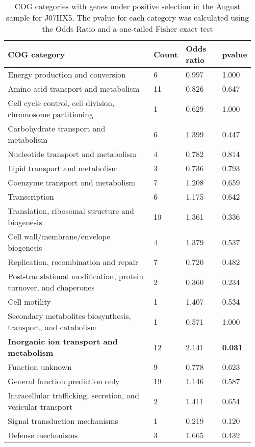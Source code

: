 \begin{table}[hb]
\footnotesize 
	\tabcolsep=0.11cm 
\caption{COG categories with genes under positive selection in the August sample for J07HX5. The pvalue for each category was calculated using the Odds Ratio and a one-tailed Fisher exact test} 
\begin{tabularx}{\textwidth}{L{6cm}R{2cm}R{2cm}R{2cm}} 
\hline 
\textbf{COG category} & \textbf{Count} & \textbf{Odds ratio} & \textbf{pvalue} \\ 
\hline 
Energy production and conversion & 6 & 0.997 & 1.000 \\ 
Amino acid transport and metabolism & 11 & 0.826 & 0.647 \\ 
Cell cycle control, cell division, chromosome partitioning & 1 & 0.629 & 1.000 \\ 
Carbohydrate transport and metabolism & 6 & 1.399 & 0.447 \\ 
Nucleotide transport and metabolism & 4 & 0.782 & 0.814 \\ 
Lipid transport and metabolism & 3 & 0.736 & 0.793 \\ 
Coenzyme transport and metabolism & 7 & 1.208 & 0.659 \\ 
Transcription & 6 & 1.175 & 0.642 \\ 
Translation, ribosomal structure and biogenesis & 10 & 1.361 & 0.336 \\ 
Cell wall/membrane/envelope biogenesis & 4 & 1.379 & 0.537 \\ 
Replication, recombination and repair & 7 & 0.720 & 0.482 \\ 
Post-translational modification, protein turnover, and chaperones & 2 & 0.360 & 0.234 \\ 
Cell motility & 1 & 1.407 & 0.534 \\ 
Secondary metabolites biosynthesis, transport, and catabolism & 1 & 0.571 & 1.000 \\ 
\textbf{Inorganic ion transport and metabolism} & 12 & 2.141 & \textbf{0.031} \\ 
Function unknown & 9 & 0.778 & 0.623 \\ 
General function prediction only & 19 & 1.146 & 0.587 \\ 
Intracellular trafficking, secretion, and vesicular transport & 2 & 1.411 & 0.654 \\ 
Signal transduction mechanisms & 1 & 0.219 & 0.120 \\ 
Defense mechanisms & 3 & 1.665 & 0.432 \\ 
\end{tabularx} 
\label{August_COG_Selection_J07HX5} 
 \end{table} 


